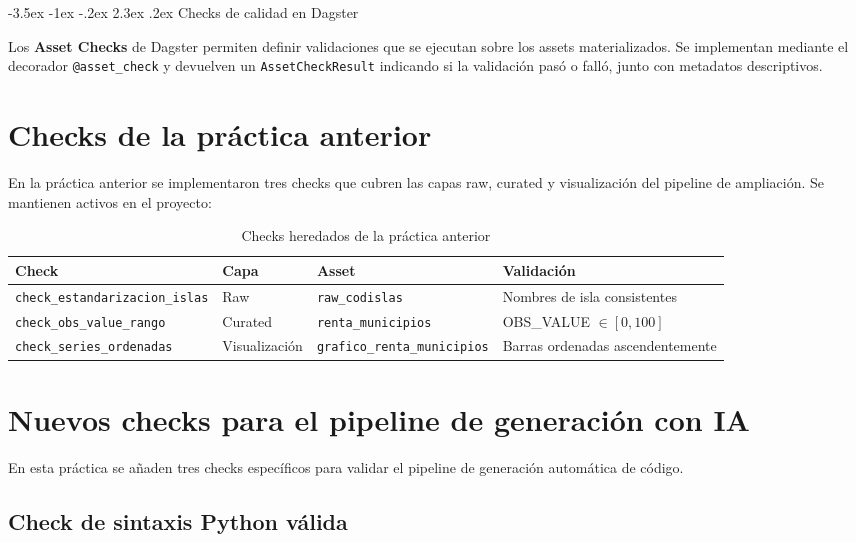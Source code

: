 \documentclass[11pt]{report}
\makeatletter
\renewcommand\chapter{\@startsection{chapter}{0}{\z@}%
    {-3.5ex \@plus -1ex \@minus -.2ex}%
    {2.3ex \@plus.2ex}%
    {\normalfont\Large\bfseries}}
\makeatother
\begin{document}
\chapter{Checks de calidad en Dagster}

Los \textbf{Asset Checks} de Dagster permiten definir validaciones que se ejecutan sobre los assets
materializados. Se implementan mediante el decorador \texttt{@asset\_check} y devuelven un
\texttt{AssetCheckResult} indicando si la validación pasó o falló, junto con metadatos descriptivos.

\section{Checks de la práctica anterior}

En la práctica anterior se implementaron tres checks que cubren las capas raw, curated y
visualización del pipeline de ampliación. Se mantienen activos en el proyecto:

\begin{table}[H]
\centering
\begin{tabular}{@{}llll@{}}
\toprule
\textbf{Check} & \textbf{Capa} & \textbf{Asset} & \textbf{Validación} \\
\midrule
\texttt{check\_estandarizacion\_islas} & Raw & \texttt{raw\_codislas} & Nombres de isla consistentes \\
\texttt{check\_obs\_value\_rango}      & Curated & \texttt{renta\_municipios} & OBS\_VALUE $\in [0, 100]$ \\
\texttt{check\_series\_ordenadas}      & Visualización & \texttt{grafico\_renta\_municipios} & Barras ordenadas ascendentemente \\
\bottomrule
\end{tabular}
\caption{Checks heredados de la práctica anterior}
\end{table}

\section{Nuevos checks para el pipeline de generación con IA}

En esta práctica se añaden tres checks específicos para validar el pipeline de generación
automática de código.

\subsection{Check de sintaxis Python válida}
\end{document}
